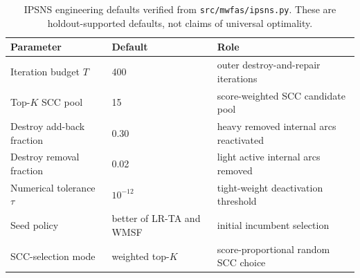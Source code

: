 \begin{table}[t]
\centering
\footnotesize
\caption{IPSNS engineering defaults verified from \texttt{src/mwfas/ipsns.py}. These are holdout-supported defaults, not claims of universal optimality.}
\label{tab:ipsns-parameters}
\begin{tabularx}{\linewidth}{@{}>{\raggedright\arraybackslash}p{2.6cm}l>{\raggedright\arraybackslash}X@{}}
\toprule
Parameter & Default & Role \\
\midrule
Iteration budget \(T\) & 400 & outer destroy-and-repair iterations \\
Top-\(K\) SCC pool & 15 & score-weighted SCC candidate pool \\
Destroy add-back fraction & 0.30 & heavy removed internal arcs reactivated \\
Destroy removal fraction & 0.02 & light active internal arcs removed \\
Numerical tolerance \(\tau\) & \(10^{-12}\) & tight-weight deactivation threshold \\
Seed policy & better of LR-TA and WMSF & initial incumbent selection \\
SCC-selection mode & weighted top-\(K\) & score-proportional random SCC choice \\
\bottomrule
\end{tabularx}
\end{table}
